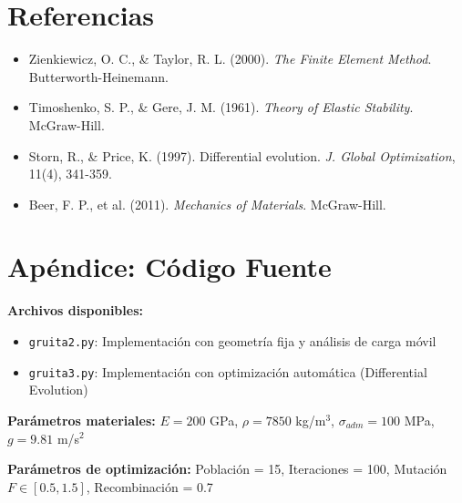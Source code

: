 \documentclass[10pt,a4paper]{article}
\begin{document}
\vspace{0.3cm}

\section*{Referencias}
\small
\begin{itemize}
\item Zienkiewicz, O. C., \& Taylor, R. L. (2000). \textit{The Finite Element Method}. Butterworth-Heinemann.
\item Timoshenko, S. P., \& Gere, J. M. (1961). \textit{Theory of Elastic Stability}. McGraw-Hill.
\item Storn, R., \& Price, K. (1997). Differential evolution. \textit{J. Global Optimization}, 11(4), 341-359.
\item Beer, F. P., et al. (2011). \textit{Mechanics of Materials}. McGraw-Hill.
\end{itemize}

\appendix
\section*{Apéndice: Código Fuente}
\small
\textbf{Archivos disponibles:}
\begin{itemize}
\item \texttt{gruita2.py}: Implementación con geometría fija y análisis de carga móvil
\item \texttt{gruita3.py}: Implementación con optimización automática (Differential Evolution)
\end{itemize}

\textbf{Parámetros materiales:} $E = 200$ GPa, $\rho = 7850$ kg/m$^3$, $\sigma_{adm} = 100$ MPa, $g = 9.81$ m/s$^2$

\textbf{Parámetros de optimización:} Población = 15, Iteraciones = 100, Mutación $F \in [0.5,1.5]$, Recombinación = 0.7
\end{document}
